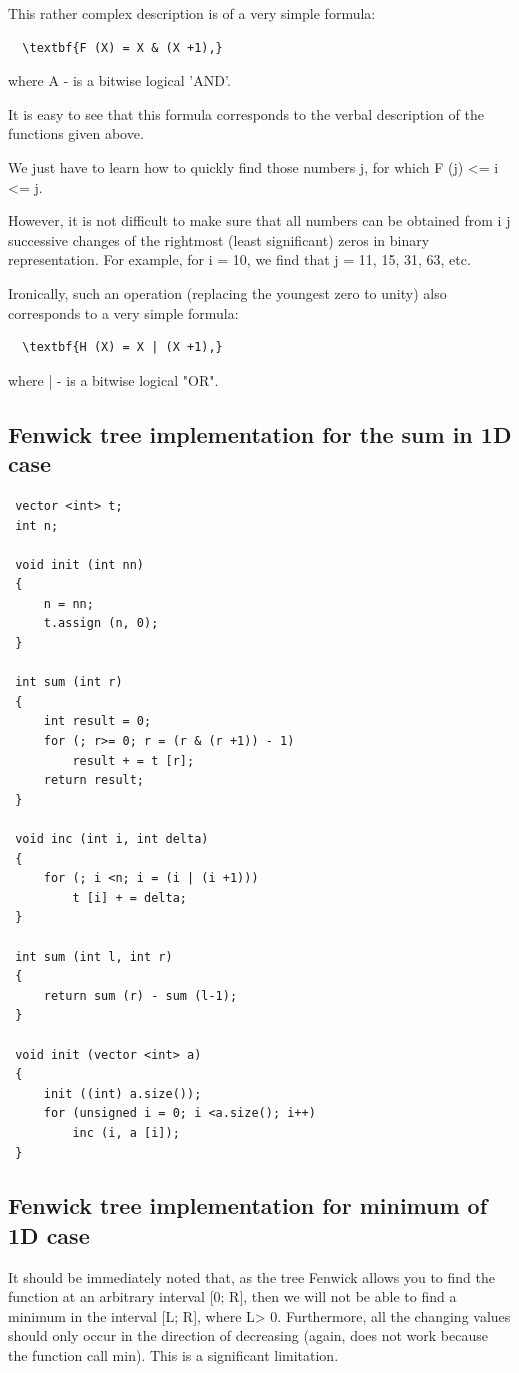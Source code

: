 This rather complex description is of a very simple formula:

\begin{verbatim}
  \textbf{F (X) = X & (X +1),} 
\end{verbatim}
where A - is a bitwise logical 'AND'.

It is easy to see that this formula corresponds to the verbal description of the functions given above.

We just have to learn how to quickly find those numbers j, for which F (j) <= i <= j.

However, it is not difficult to make sure that all numbers can be obtained from i j successive changes of the rightmost (least significant) zeros in binary representation. For example, for i = 10, we find that j = 11, 15, 31, 63, etc.

Ironically, such an operation (replacing the youngest zero to unity) also corresponds to a very simple formula:

\begin{verbatim}
  \textbf{H (X) = X | (X +1),} 
\end{verbatim}
where | - is a bitwise logical "OR".

\subsection{ Fenwick tree implementation for the sum in 1D case }
\begin{verbatim}
 vector <int> t;
 int n;

 void init (int nn)
 {
     n = nn;
     t.assign (n, 0);
 }

 int sum (int r)
 {
     int result = 0;
     for (; r>= 0; r = (r & (r +1)) - 1)
         result + = t [r];
     return result;
 }

 void inc (int i, int delta)
 {
     for (; i <n; i = (i | (i +1)))
         t [i] + = delta;
 }

 int sum (int l, int r)
 {
     return sum (r) - sum (l-1);
 }

 void init (vector <int> a)
 {
     init ((int) a.size());
     for (unsigned i = 0; i <a.size(); i++)
         inc (i, a [i]);
 } 
\end{verbatim}

\subsection{ Fenwick tree implementation for minimum of 1D case }
It should be immediately noted that, as the tree Fenwick allows you to find the function at an arbitrary interval [0; R], then we will not be able to find a minimum in the interval [L; R], where L> 0. Furthermore, all the changing values ​​should only occur in the direction of decreasing (again, does not work because the function call min). This is a significant limitation.


